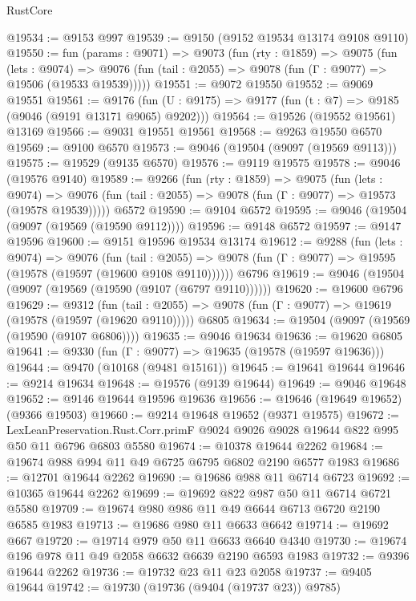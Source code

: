 \begin{lexlean}{RustCore}
\begin{coremodule}
@19534 := @9153 @997
@19539 := @9150 (@9152 @19534 @13174 @9108 @9110)
@19550 := fun (params : @9071) =>
  @9073
    (fun (rty : @1859) =>
    @9075
      (fun (lets : @9074) =>
      @9076 (fun (tail : @2055) => @9078 (fun (Γ : @9077) => @19506 (@19533 @19539)))))
@19551 := @9072 @19550
@19552 := @9069 @19551
@19561 := @9176
    (fun (U : @9175) => @9177 (fun (t : @7) => @9185 (@9046 (@9191 @13171 @9065) @9202)))
@19564 := @19526 (@19552 @19561) @13169
@19566 := @9031 @19551 @19561
@19568 := @9263 @19550 @6570
@19569 := @9100 @6570
@19573 := @9046 (@19504 (@9097 (@19569 @9113)))
@19575 := @19529 (@9135 @6570)
@19576 := @9119 @19575
@19578 := @9046 (@19576 @9140)
@19589 := @9266
    (fun (rty : @1859) =>
    @9075
      (fun (lets : @9074) =>
      @9076 (fun (tail : @2055) => @9078 (fun (Γ : @9077) => @19573 (@19578 @19539)))))
    @6572
@19590 := @9104 @6572
@19595 := @9046 (@19504 (@9097 (@19569 (@19590 @9112))))
@19596 := @9148 @6572
@19597 := @9147 @19596
@19600 := @9151 @19596 @19534 @13174
@19612 := @9288
    (fun (lets : @9074) =>
    @9076
      (fun (tail : @2055) =>
      @9078 (fun (Γ : @9077) => @19595 (@19578 (@19597 (@19600 @9108 @9110))))))
    @6796
@19619 := @9046 (@19504 (@9097 (@19569 (@19590 (@9107 (@6797 @9110))))))
@19620 := @19600 @6796
@19629 := @9312
    (fun (tail : @2055) => @9078 (fun (Γ : @9077) => @19619 (@19578 (@19597 (@19620 @9110)))))
    @6805
@19634 := @19504 (@9097 (@19569 (@19590 (@9107 @6806))))
@19635 := @9046 @19634
@19636 := @19620 @6805
@19641 := @9330 (fun (Γ : @9077) => @19635 (@19578 (@19597 @19636)))
@19644 := @9470 (@10168 (@9481 @15161))
@19645 := @19641 @19644
@19646 := @9214 @19634
@19648 := @19576 (@9139 @19644)
@19649 := @9046 @19648
@19652 := @9146 @19644 @19596 @19636
@19656 := @19646 (@19649 @19652) (@9366 @19503)
@19660 := @9214 @19648 @19652 (@9371 @19575)
@19672 := LexLeanPreservation.Rust.Corr.primF
    @9024
    @9026
    @9028
    @19644
    @822
    @995
    @50
    @11
    @6796
    @6803
    @5580
@19674 := @10378 @19644 @2262
@19684 := @19674 @988 @994 @11 @49 @6725 @6795 @6802 @2190 @6577 @1983
@19686 := @12701 @19644 @2262
@19690 := @19686 @988 @11 @6714 @6723
@19692 := @10365 @19644 @2262
@19699 := @19692 @822 @987 @50 @11 @6714 @6721 @5580
@19709 := @19674 @980 @986 @11 @49 @6644 @6713 @6720 @2190 @6585 @1983
@19713 := @19686 @980 @11 @6633 @6642
@19714 := @19692 @667
@19720 := @19714 @979 @50 @11 @6633 @6640 @4340
@19730 := @19674 @196 @978 @11 @49 @2058 @6632 @6639 @2190 @6593 @1983
@19732 := @9396 @19644 @2262
@19736 := @19732 @23 @11 @23 @2058
@19737 := @9405 @19644
@19742 := @19730 (@19736 (@9404 (@19737 @23)) @9785)

\end{coremodule}
\end{lexlean}
